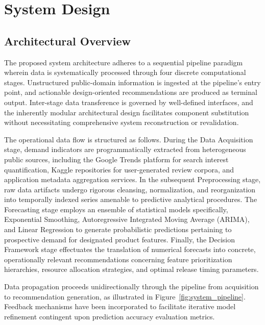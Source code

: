 \section{System Design}

\subsection{Architectural Overview}
The proposed system architecture adheres to a sequential pipeline paradigm wherein data is systematically processed through four discrete computational stages. Unstructured public-domain information is ingested at the pipeline's entry point, and actionable design-oriented recommendations are produced as terminal output. Inter-stage data transference is governed by well-defined interfaces, and the inherently modular architectural design facilitates component substitution without necessitating comprehensive system reconstruction or revalidation.

The operational data flow is structured as follows. During the Data Acquisition stage, demand indicators are programmatically extracted from heterogeneous public sources, including the Google Trends platform for search interest quantification, Kaggle repositories for user-generated review corpora, and application metadata aggregation services. In the subsequent Preprocessing stage, raw data artifacts undergo rigorous cleansing, normalization, and reorganization into temporally indexed series amenable to predictive analytical procedures. The Forecasting stage employs an ensemble of statistical models specifically, Exponential Smoothing, Autoregressive Integrated Moving Average (ARIMA), and Linear Regression to generate probabilistic predictions pertaining to prospective demand for designated product features. Finally, the Decision Framework stage effectuates the translation of numerical forecasts into concrete, operationally relevant recommendations concerning feature prioritization hierarchies, resource allocation strategies, and optimal release timing parameters.

Data propagation proceeds unidirectionally through the pipeline from acquisition to recommendation generation, as illustrated in Figure~\ref{fig:system_pipeline}. Feedback mechanisms have been incorporated to facilitate iterative model refinement contingent upon prediction accuracy evaluation metrics.

